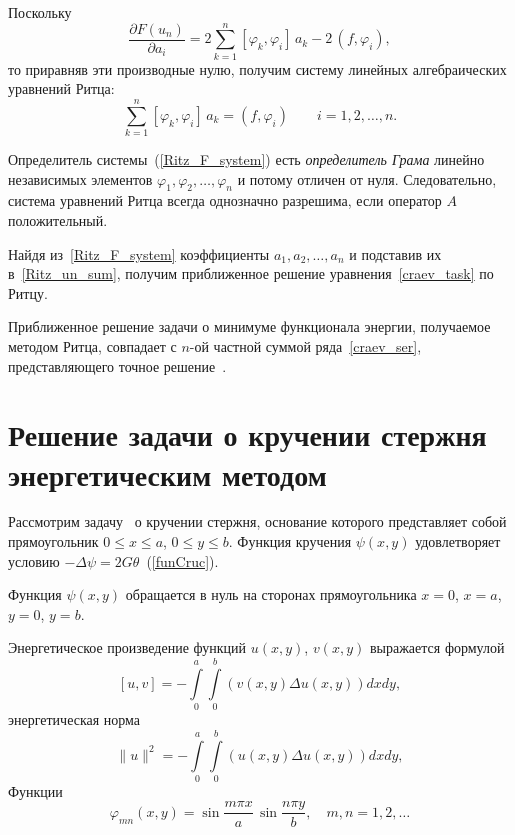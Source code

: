 \documentclass[12pt, a4paper]{article}
\begin{document}
Поскольку
\[
	\frac{\partial F(u_n)}{\partial a_i} =
	2 \sum_{k = 1}^n [\varphi_k, \varphi_i] \, a_k - 2\,(f, \varphi_i),
\]
то приравняв эти производные нулю, получим систему линейных алгебраических уравнений  Ритца:
\begin{equation}\label{Ritz_F_system}
	\sum_{k = 1}^n [\varphi_k, \varphi_i] \, a_k = (f, \varphi_i) \qquad
	i = 1, 2, \ldots, n.
\end{equation}

Определитель системы~(\ref{Ritz_F_system})
есть \emph{определитель Грама} линейно независимых элементов
$\varphi_1, \varphi_2, \ldots, \varphi_n$ и потому отличен от нуля. Следовательно,
система уравнений Ритца всегда однозначно разрешима, если оператор $A$ положительный.

Найдя из~\eqref{Ritz_F_system} коэффициенты $a_1, a_2, \ldots, a_n$ и
подставив их в~\eqref{Ritz_un_sum}, получим приближенное решение уравнения~\eqref{craev_task} по Ритцу.

Приближенное решение задачи о минимуме функционала
энергии, получаемое методом Ритца, совпадает с $n$-ой частной
суммой ряда~\eqref{craev_ser}, представляющего точное решение~\cite{Michilin}.

\section{Решение задачи о кручении стержня энергетическим методом}
Рассмотрим задачу~\cite{Michilin} о кручении стержня, основание которого представляет собой   прямоугольник
$0 \leqslant x \leqslant a$, $0 \leqslant y \leqslant b$.
Функция кручения $\psi(x, y)$ удовлетворяет условию $-\Delta \psi = 2 G \theta$~(\ref{funCruc}).

Функция $\psi(x, y)$ обращается в нуль на
сторонах прямоугольника $x= 0$, $x = a$, $y = 0$, $y = b$.

Энергетическое произведение функций $u(x, y)$, $v(x, y)$ выражается формулой
\begin{equation}  
	\label{multUV}
	[\textit{u}, \textit{v}] = - \int\limits_0^a \int\limits_0^b \left(v(x, y) \Delta u(x, y ) \right) dx dy,
\end{equation}
энергетическая норма
\begin{equation}  
	\label{energoNorm}
	\|u\|^2 = - \int\limits_0^a \int\limits_0^b \left(u(x, y) \Delta u(x, y ) \right) dx dy,
\end{equation}
Функции
\begin{equation}  
	\label{phi_mn}
	\varphi_{mn}(x, y) = \sin\frac{m\pi x}{a} \, \sin\frac{n\pi y}{b}, \quad
	m, n = 1, 2, \ldots
\end{equation}
\end{document}
